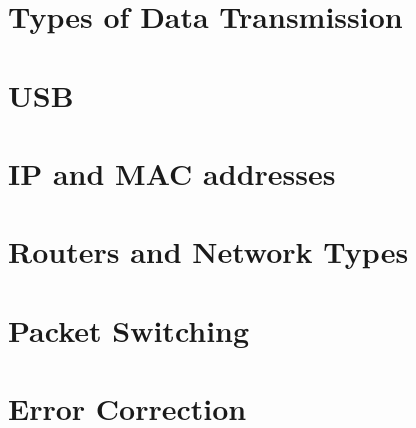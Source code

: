 \documentclass[../main.tex]{subfiles}
\begin{document}
\section{Types of Data Transmission}


\section{USB}
\label{2:usb}


\section{IP and MAC addresses}


\section{Routers and Network Types}


\section{Packet Switching}


\section{Error Correction}

\end{document}
